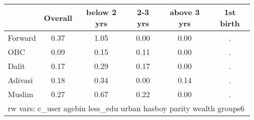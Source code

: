 \begin{tabular}{l*{5}{c}}
\toprule
            &\multicolumn{1}{c}{Overall}&\multicolumn{1}{c}{below 2 yrs}&\multicolumn{1}{c}{2-3 yrs}&\multicolumn{1}{c}{above 3 yrs}&\multicolumn{1}{c}{1st birth}\\
\midrule
\midrule
Forward     &        0.37&        1.05&        0.00&        0.00&           .\\
OBC         &        0.09&        0.15&        0.11&        0.00&           .\\
Dalit       &        0.17&        0.29&        0.17&        0.00&           .\\
Adivasi     &        0.18&        0.34&        0.00&        0.14&           .\\
Muslim      &        0.27&        0.67&        0.22&        0.00&           .\\
\bottomrule
\multicolumn{6}{l}{\footnotesize rw vars: c\_user agebin less\_edu urban hasboy parity wealth groups6}\\
\end{tabular}
